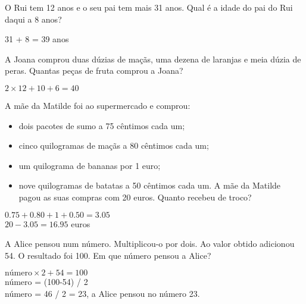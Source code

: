 \documentclass[11pt,a4paper,addpoints]{exam}
\begin{document}
\begin{questions}
  
\question[5] O Rui tem 12 anos e o seu pai tem mais 31 anos.
Qual é a idade do pai do Rui daqui a 8 anos?
\begin{solutionordottedlines}[1cm]
 31 + 8 = 39 anos    
 \end{solutionordottedlines}
    
 \question[10] A Joana comprou duas dúzias de maçãs, uma dezena de
laranjas e meia dúzia de peras. Quantas peças de fruta comprou a Joana?

\begin{solutionordottedlines}[1cm]
  $2 \times 12+10+6 = 40$
 \end{solutionordottedlines}


\question[15] A mãe da Matilde foi ao supermercado e comprou:
\begin{itemize}
  \item dois pacotes de sumo a 75 cêntimos cada um;
  \item cinco quilogramas de maçãs a 80 cêntimos cada um;
  \item um quilograma de bananas por 1 euro;
  \item nove quilogramas de batatas a 50 cêntimos cada um.
A mãe da Matilde pagou as suas compras com 20 euros. Quanto recebeu de troco?
\end{itemize}
\begin{solutionordottedlines}[2cm]
  $0.75 + 0.80 + 1 + 0.50 = 3.05$\\
  $20 - 3.05 = 16.95$ \qquad  euros
 \end{solutionordottedlines}
 

 \question[15] A Alice pensou num número. Multiplicou-o por dois. Ao valor obtido adicionou 54.
 O resultado foi 100. Em que número pensou a Alice?
 \begin{solutionordottedlines}[2cm]
   $\text{número} \times 2 + 54 = 100$\\
   número = (100-54) / 2 \\
   número = 46 / 2 = 23, a Alice pensou no número 23.
 \end{solutionordottedlines}

 
\end{questions}
    
\addpoints
\centering{\gradetable[h][questions]}
\end{document}

